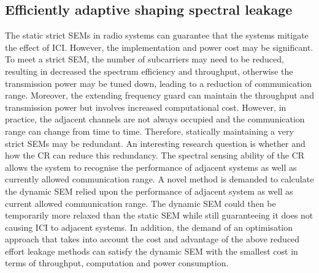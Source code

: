 \subsection{Efficiently adaptive shaping spectral leakage}
The static strict SEMs in radio systems can guarantee that the systems mitigate the effect of ICI. However, the implementation and power cost may be significant. 
To meet a strict SEM, the number of subcarriers may need to be reduced, resulting in decreased the spectrum efficiency and throughput, otherwise the transmission power may be tuned down, leading to a reduction of communication range. 
Moreover, the extending frequency guard can maintain the throughput and transmission power but involves increased computational cost.
However, in practice, the adjacent channels are not always occupied and the communication range can change from time to time. Therefore, statically maintaining a very strict SEMs may be redundant. 
An interesting research question is whether and how the CR can reduce this redundancy.
The spectral sensing ability of the CR allows the system to recognise the performance of adjacent systems as well as currently allowed communication range.
A novel method is demanded to calculate the dynamic SEM relied upon the performance of adjacent system as well as current allowed communication range. 
The dynamic SEM could then be temporarily more relaxed than the static SEM while still guaranteeing it does not causing ICI to adjacent systems.
In addition, the demand of an optimisation approach that takes into account the cost and advantage of the above reduced effort leakage methods can satisfy the dynamic SEM with the smallest cost in terms of throughput, computation and power consumption. 

